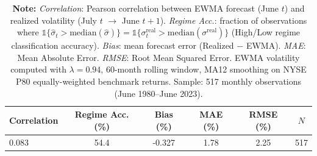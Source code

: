 
\begin{table}[htbp]
\centering
\caption{EWMA Volatility Forecast Calibration Quality (1980--2023)}
\label{tab:ewma_calibration}
\begin{tabular}{lccccc}
\toprule
Correlation & Regime Acc. (\%) & Bias (\%) & MAE (\%) & RMSE (\%) & $N$ \\
\midrule
0.083 & 54.4 & -0.327 & 1.78 & 2.25 & 517 \\
\bottomrule
\end{tabular}
\caption*{\footnotesize \textbf{Note:} \textit{Correlation}: Pearson correlation between EWMA forecast (June $t$) and realized volatility (July $t$ $\rightarrow$ June $t+1$). 
\textit{Regime Acc.}: fraction of observations where $\mathbb{1}\{\hat{\sigma}_{t}>\mathrm{median}(\hat{\sigma})\}=\mathbb{1}\{\sigma^{\text{real}}_{t}>\mathrm{median}(\sigma^{\text{real}})\}$ (High/Low regime classification accuracy).
\textit{Bias}: mean forecast error (Realized $-$ EWMA). 
\textit{MAE}: Mean Absolute Error. 
\textit{RMSE}: Root Mean Squared Error. 
EWMA volatility computed with $\lambda=0.94$, 60-month rolling window, MA12 smoothing on NYSE P80 equally-weighted benchmark returns. 
Sample: 517 monthly observations (June 1980--June 2023).}
\end{table}
